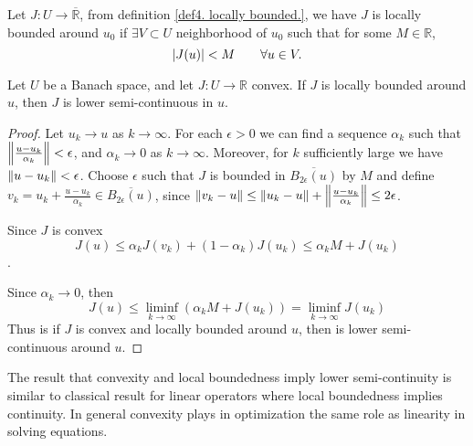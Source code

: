 \begin{remark}
	Let $J:U\rightarrow \overline{\mathbb{R}}$, from definition \ref{def4. locally bounded.},  we have $J$ is locally bounded around $u_0$ if $\exists V\subset U$ neighborhood of $u_0$ such that for some $M \in \mathbb{R}$,
	\[
		\left|J(u)\right| < M \qquad \forall u \in V.
	\]
\end{remark}
\begin{lemma}
	Let $U$ be a Banach space, and let $J:U\rightarrow \mathbb{R}$ convex. If $J$ is locally bounded around $u$, then $J$ is lower semi-continuous in $u$.
	\begin{proof}
		Let $u_k \rightarrow u$ as $k\rightarrow\infty$. For each $\epsilon > 0$ we can find a sequence $\alpha_k$ such that $\left\lVert\frac{u-u_k}{\alpha_k}\right\rVert< \epsilon$, and $\alpha_k \rightarrow 0$ as $k\rightarrow \infty$. Moreover, for $k$ sufficiently large we have $\left\lVert u-u_k\right\rVert<\epsilon$. Choose $\epsilon$ such that $J$ is bounded in $\overline{B_{2\epsilon}(u)}$ by $M$ and define $v_k = u_k + \frac{u-u_k}{\alpha_k} \in \overline{B_{2\epsilon}(u)}$, since  $\left\lVert v_k-u\right\rVert\leq \left\lVert u_k-u\right\rVert+\left\lVert\frac{u-u_k}{\alpha_k}\right\rVert\leq 2\epsilon$. 
		
		Since $J$ is convex \[J(u)\leq \alpha_k J(v_k) + (1-\alpha_k)J(u_k) \leq \alpha_k M+J(u_k)\].
		
		Since $\alpha_k \rightarrow 0$, then
		\[J(u)\leq \liminf_{k\rightarrow \infty}(\alpha_kM+J(u_k)) = \liminf_{k\rightarrow\infty} J(u_k) \]
		Thus is if $J$ is convex and locally bounded around $u$, then is lower semi-continuous around $u$.
	\end{proof}
\end{lemma}
%
\begin{remark}
	The result that convexity and local boundedness imply lower semi-continuity is similar to classical result for linear operators where local boundedness implies continuity. In general convexity plays in optimization the same role as linearity in solving equations.
\end{remark}